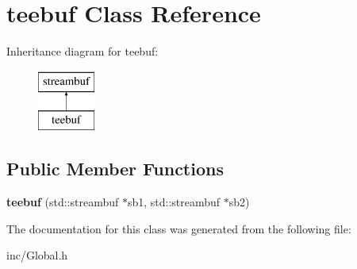 \hypertarget{classteebuf}{\section{teebuf Class Reference}
\label{classteebuf}
}
Inheritance diagram for teebuf\-:\begin{figure}[H]
\begin{center}
\leavevmode
\includegraphics[height=2.000000cm]{classteebuf}
\end{center}
\end{figure}
\subsection*{Public Member Functions}
\begin{DoxyCompactItemize}
\item 
\hypertarget{classteebuf_a874f4618a07d33370216658636c23558}{{\bfseries teebuf} (std\-::streambuf $\ast$sb1, std\-::streambuf $\ast$sb2)}\label{classteebuf_a874f4618a07d33370216658636c23558}

\end{DoxyCompactItemize}


The documentation for this class was generated from the following file\-:\begin{DoxyCompactItemize}
\item 
inc/Global.\-h\end{DoxyCompactItemize}
